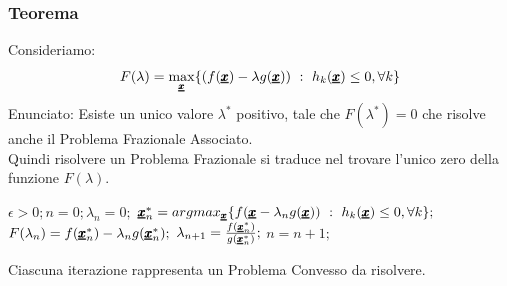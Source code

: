 \subsubsection{Teorema}
Consideriamo:
\begin{equation*}
    F(\lambda) = \max_{\pmb{\underline{x}}} \{ (f(\pmb{\underline{x}}) - \lambda  g(\pmb{\underline{x}})) \ : \ h_k(\pmb{\underline{x}}) \leq 0, \forall k \}
\end{equation*}
Enunciato: Esiste un unico valore $\lambda^*$ positivo, tale che $F(\lambda^*) = 0$ che risolve anche il Problema Frazionale Associato.\\
Quindi risolvere un Problema Frazionale si traduce nel trovare l'unico zero della funzione $F(\lambda)$.\\
\begin{algorithm}
\begin{algorithmic}
\Large
{} $\epsilon > 0; n = 0; \lambda_n = 0;$
\Repeat
\State $\pmb{\underline{x}}_n^* = argmax_{\pmb{\underline{x}}} \{f(\pmb{\underline{x}} - \lambda_n g(\pmb{\underline{x}})) \ : \ h_k(\pmb{\underline{x}}) \leq 0, \forall k\};$
\State $F(\lambda_n) = f(\pmb{\underline{x}}_n^*) - \lambda_n g(\pmb{\underline{x}}_n^*);$
\State $\lambda_{n+1} = \frac{f(\pmb{\underline{x}}_n^*)}{g(\pmb{\underline{x}}_n^*)};$
\State $n = n + 1;$
\end{algorithmic}
\end{algorithm}
\begin{center}
    Ciascuna iterazione rappresenta un Problema Convesso da risolvere.
\end{center}


